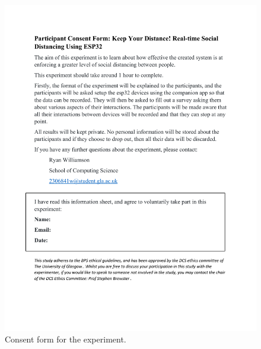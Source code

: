 \documentclass{l4proj}
\begin{document}
\begin{appendices}
    \begin{figure}[!htb]
        \centering
        \includegraphics[width=1.0\linewidth]{images/Participant Consent Form.pdf}

        \caption{ Consent form for the experiment. }

        \label{fig:participant_consent}
    \end{figure}


\end{appendices}
\end{document}
